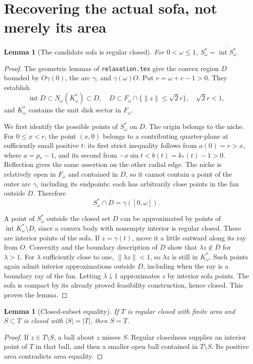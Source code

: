 \documentclass[11pt]{article}
\newtheorem{lemma}[theorem]{Lemma}
\begin{document}
\section{Recovering the actual sofa, not merely its area}
\begin{lemma}[The candidate sofa is regular closed]\label{lem:regular}
For $0<\omega\le1$, $S_\omega^*=\overline{\operatorname{int}S_\omega^*}$.
\end{lemma}
\begin{proof}
The geometric lemmas of \texttt{relaxation.tex} give the convex region $D$ bounded by $O\gamma(0)$, the arc $\gamma$, and $\gamma(\omega)O$. Put $r=\omega+c-1>0$. They establish
\[
 \operatorname{int}D\subset N_\omega(K_\omega^*)\subset D,
 \quad D\subset F_\omega\cap\{\|z\|\le\sqrt2 r\},\quad \sqrt2 r<1,
\]
and $K_\omega^*$ contains the unit disk sector in $F_\omega$.

We first identify the possible points of $S_\omega^*$ on $D$. The origin belongs to the niche. For $0\le x<r$, the point $(x,0)$ belongs to a contributing quarter-plane at sufficiently small positive $t$: its first strict inequality follows from $a(0)=r>x$, where $a=p_*-1$, and its second from $-x\sin t<b(t)=k_*(t)-1>0$. Reflection gives the same assertion on the other radial edge. The niche is relatively open in $F_\omega$ and contained in $D$, so it cannot contain a point of the outer arc $\gamma$, including its endpoints: each has arbitrarily close points in the fan outside $D$. Therefore
\[
 S_\omega^*\cap D=\gamma([0,\omega]).
\]

A point of $S_\omega^*$ outside the closed set $D$ can be approximated by points of $\operatorname{int}K_\omega^*\setminus D$, since a convex body with nonempty interior is regular closed. These are interior points of the sofa. If $z=\gamma(t)$, move it a little outward along its ray from $O$. Convexity and the boundary description of $D$ show that $\lambda z\notin D$ for $\lambda>1$. For $\lambda$ sufficiently close to one, $\|\lambda z\|<1$, so $\lambda z$ is still in $K_\omega^*$. Such points again admit interior approximations outside $D$, including when the ray is a boundary ray of the fan. Letting $\lambda\downarrow1$ approximates $z$ by interior sofa points. The sofa is compact by its already proved feasibility construction, hence closed. This proves the lemma.
\end{proof}

\begin{lemma}[Closed-subset equality]
If $T$ is regular closed with finite area and $S\subset T$ is closed with $|S|=|T|$, then $S=T$.
\end{lemma}
\begin{proof}
If $z\in T\setminus S$, a ball about $z$ misses $S$. Regular closedness supplies an interior point of $T$ in that ball, and then a smaller open ball contained in $T\setminus S$. Its positive area contradicts area equality.
\end{proof}
\end{document}
